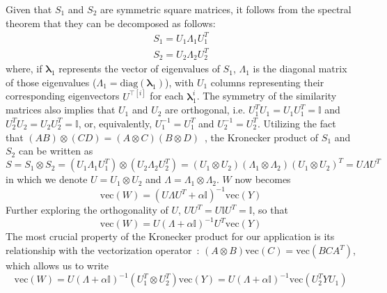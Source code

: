 \documentclass[sn-mathphys-num]{sn-jnl}%
\newcommand{\T}{^T}
\theoremstyle{thmstyleone}%
\theoremstyle{thmstyletwo}%
\theoremstyle{thmstylethree}%
\begin{document}
\begin{appendices}
Given that $S_1$ and $S_2$ are symmetric square matrices, it follows from the spectral theorem that they can be decomposed as follows:  %
%
\begin{gather*}
    S_1 = U_1 \Lambda_1 U_1\T \\
    S_2 = U_2 \Lambda_2 U_2\T
\end{gather*}
%
where, if $\mathbf{\lambda}_1$ represents the vector of eigenvalues of $S_1$, $\Lambda_1$ is the diagonal matrix of those eigenvalues ($\Lambda_1 = \text{diag}(\mathbf{\lambda}_1)$), with $U_1$ columns representing their corresponding eigenvectors $U^{\intercal[i]}$ for each $\mathbf{\lambda}_1^{i}$. The symmetry of the similarity matrices also implies that $U_1$ and $U_2$ are orthogonal, i.e. $U_1\T U_1 = U_1 U_1\T = \mathbb{I}$ and $U_2\T U_2 = U_2 U_2\T = \mathbb{I}$, or, equivalently, $U_1^{-1} = U_1\T$ and $U_2^{-1} = U_2\T$.
%
Utilizing the fact that $(AB) \otimes (CD) = (A \otimes C)(B \otimes D)$~\cite{schafer1966introduction}, the Kronecker product of $S_1$ and $S_2$ can be written as
%
\begin{equation}
    S = S_1 \otimes S_2
    = (U_1 \Lambda_1 U_1\T) \otimes (U_2 \Lambda_2 U_2\T)
    = (U_1 \otimes U_2) (\Lambda_1 \otimes \Lambda_2) (U_1 \otimes U_2)\T
    = U \Lambda U\T
\end{equation}
%
in which we denote $U = U_1 \otimes U_2$ and $\Lambda = \Lambda_1 \otimes \Lambda_2$.
$W$ now becomes
%
\begin{equation*}
    \text{vec}(W) = (U \Lambda U\T + \alpha \mathbb{I})^{-1} \text{vec}(Y)
\end{equation*}
%
Further exploring the orthogonality of $U$, $U U\T = U \mathbb{I} U\T = \mathbb{I}$, so that
%
\begin{equation*}
    \text{vec}(W) = U (\Lambda + \alpha\mathbb{I})^{-1} U\T \text{vec}(Y)
\end{equation*}
%
The most crucial property of the Kronecker product for our application is its relationship with the vectorization operator~\cite{schafer1966introduction}: $(A \otimes B)\text{vec} (C) = \text{vec}(BCA\T)$, which allows us to write
%
\begin{equation*}
    \text{vec}(W)
    = U (\Lambda + \alpha\mathbb{I})^{-1} (U_1\T \otimes U_2\T) \text{vec}(Y)
    = U (\Lambda + \alpha\mathbb{I})^{-1} \text{vec}(U_2\T Y U_1)
\end{equation*}

\end{appendices}
\end{document}

